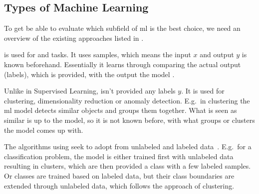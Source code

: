 \subsection{Types of Machine Learning}
\label{subsec:machine-learning-types}

To get be able to evaluate which subfield of \gls{ml} is the best choice, we need an overview of the existing approaches listed in \cite{ghahramani2003unsupervised}.

 is used for  and  tasks.
It uses  samples, which means the input $x$ and output $y$ is known beforehand.
Essentially it learns through comparing the actual output (labels), which is provided, with the output the model .

Unlike in Supervised Learning,  isn't provided any labels $y$.
It is used for clustering, dimensionality reduction or anomaly detection. %
E.g.\ in clustering the \gls{ml} model detects similar objects and groups them together.
What is seen as similar is up to the model, so it is not known before, with what groups or clusters the model comes up with.

The algorithms using  seek to adopt from unlabeled and labeled data~\cite{van2020survey}.
E.g.\ for a classification problem, the model is either trained first with unlabeled data resulting in clusters, which are then provided a class with a few labeled samples.
Or classes are trained based on labeled data, but their class boundaries are extended through unlabeled data, which follows the approach of clustering.

